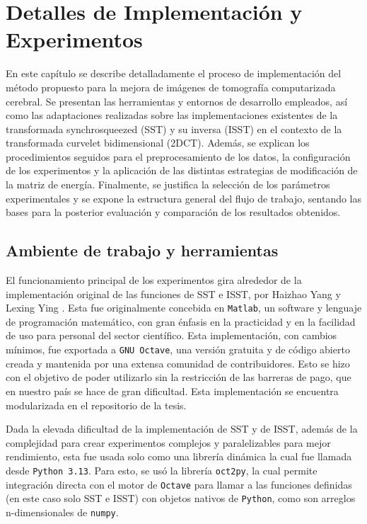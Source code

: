 \chapter{Detalles de Implementación y Experimentos}\label{chapter:implementation}

En este capítulo se describe detalladamente el proceso de implementación del método propuesto para la mejora de imágenes de tomografía computarizada cerebral. Se presentan las herramientas y entornos de desarrollo empleados, así como las adaptaciones realizadas sobre las implementaciones existentes de la transformada synchrosqueezed (SST) y su inversa (ISST) en el contexto de la transformada curvelet bidimensional (2DCT). Además, se explican los procedimientos seguidos para el preprocesamiento de los datos, la configuración de los experimentos y la aplicación de las distintas estrategias de modificación de la matriz de energía. Finalmente, se justifica la selección de los parámetros experimentales y se expone la estructura general del flujo de trabajo, sentando las bases para la posterior evaluación y comparación de los resultados obtenidos.

\section{Ambiente de trabajo y herramientas}\label{section:work-environment}

El funcionamiento principal de los experimentos gira alrededor de la implementación original de las funciones de SST e ISST, por Haizhao Yang y Lexing Ying \cite{SynchrosqueezedCurveletTransform_SynLab}. Esta fue originalmente concebida en \texttt{Matlab}, un software y lenguaje de programación matemático, con gran énfasis en la practicidad y en la facilidad de uso para personal del sector científico. Esta implementación, con cambios mínimos, fue exportada a \texttt{GNU Octave}, una versión gratuita y de código abierto creada y mantenida por una extensa comunidad de contribuidores. Esto se hizo con el objetivo de poder utilizarlo sin la restricción de las barreras de pago, que en nuestro país se hace de gran dificultad. Esta implementación se encuentra modularizada en el repositorio de la tesis.

Dada la elevada dificultad de la implementación de SST y de ISST, además de la complejidad para crear experimentos complejos y paralelizables para mejor rendimiento, esta fue usada solo como una librería dinámica la cual fue llamada desde \texttt{Python 3.13}. Para esto, se usó la librería \texttt{oct2py}, la cual permite integración directa con el motor de \texttt{Octave} para llamar a las funciones definidas (en este caso solo SST e ISST) con objetos nativos de \texttt{Python}, como son arreglos n-dimensionales de \texttt{numpy}.

